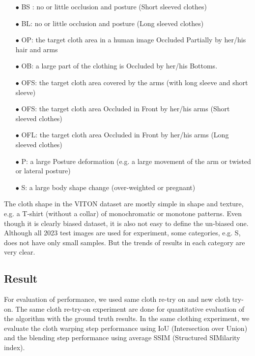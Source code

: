 \begin{itemize}

\item[$\bullet$] BS : no or little occlusion and posture (Short sleeved clothes)
\item[$\bullet$] BL: no or little occlusion and posture (Long sleeved clothes)
\item[$\bullet$] OP: the target cloth area in a human image Occluded Partially by her/his hair and arms
\item[$\bullet$] OB: a large part of the clothing is Occluded by her/his Bottoms.
\item[$\bullet$] OFS: the target cloth area covered by the arms (with long sleeve and short sleeve)
\item[$\bullet$] OFS: the target cloth area Occluded in Front by her/his arms (Short sleeved clothes)
\item[$\bullet$] OFL: the target cloth area Occluded in Front by her/his arms (Long sleeved clothes)

\item[$\bullet$] P:  a large Posture deformation (e.g. a large movement of the arm or twisted or lateral posture)
\item[$\bullet$] S:  a large body shape change  (over-weighted or pregnant)

\end{itemize}

The cloth shape in the VITON dataset are mostly simple in shape and texture, e.g. a T-shirt (without a collar) of  monochromatic or monotone patterns. Even though it is clearly biased dataset, it is also not easy to define the un-biased one. Although all 2023 test images are used for experiment, some categories, e.g. S, does not have only small samples. But the trends of results in each category are very clear. 


 
 
\subsection{Result} 



For evaluation of performance, we used same cloth re-try on and new cloth try-on. 
The same cloth re-try-on experiment are done for quantitative evaluation of the algorithm with the ground truth results. In the same clothing experiment, we evaluate the cloth warping step performance using IoU (Intersection over Union) and the blending step performance using average SSIM (Structured SIMilarity index).

